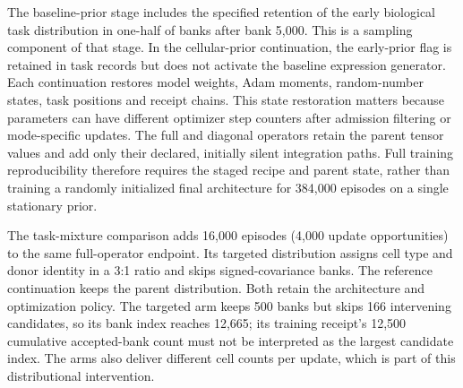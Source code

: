 The baseline-prior stage includes the specified retention of the early biological task distribution in one-half of banks after bank 5,000. This is a sampling component of that stage. In the cellular-prior continuation, the early-prior flag is retained in task records but does not activate the baseline expression generator. Each continuation restores model weights, Adam moments, random-number states, task positions and receipt chains. This state restoration matters because parameters can have different optimizer step counters after admission filtering or mode-specific updates. The full and diagonal operators retain the parent tensor values and add only their declared, initially silent integration paths. Full training reproducibility therefore requires the staged recipe and parent state, rather than training a randomly initialized final architecture for 384,000 episodes on a single stationary prior.

The task-mixture comparison adds 16,000 episodes (4,000 update opportunities) to the same full-operator endpoint. Its targeted distribution assigns cell type and donor identity in a 3:1 ratio and skips signed-covariance banks. The reference continuation keeps the parent distribution. Both retain the architecture and optimization policy. The targeted arm keeps 500 banks but skips 166 intervening candidates, so its bank index reaches 12,665; its training receipt's 12,500 cumulative accepted-bank count must not be interpreted as the largest candidate index. The arms also deliver different cell counts per update, which is part of this distributional intervention.

